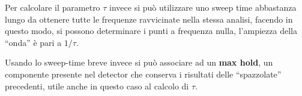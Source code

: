 Per calcolare il parametro $\tau$ invece si può utilizzare uno sweep time
abbastanza lungo da ottenere tutte le frequenze ravvicinate nella stessa analisi, facendo 
in questo modo, si possono determinare i punti a frequenza nulla, l'ampiezza
della ``onda'' è pari a $1/\tau$.

Usando lo sweep-time breve invece si può associare ad un \textbf{max hold},
un componente presente nel detector che conserva i risultati delle ``spazzolate'' precedenti,
utile anche in questo caso al calcolo di $\tau$.
